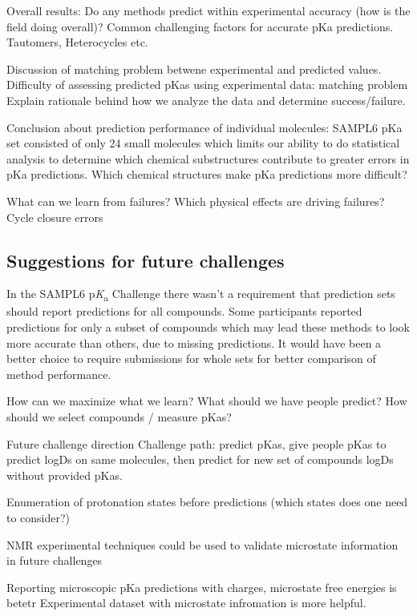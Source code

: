 \documentclass[9pt,lineno,final]{elife}
\newcommand{\pKa}{p\textit{K}\textsubscript{a}}
\begin{document}
Overall results:  
Do any methods predict within experimental accuracy (how is the field doing overall)?
Common challenging factors for accurate pKa predictions. Tautomers, Heterocycles etc.

Discussion of matching problem betwene experimental and predicted values.  
Difficulty of assessing predicted pKas using experimental data: matching problem
Explain rationale behind how we analyze the data and determine success/failure.

Conclusion about prediction performance of individual molecules:
SAMPL6 pKa set consisted of only 24 small molecules which limits our ability to do statistical analysis to determine which chemical substructures contribute to greater errors in pKa predictions.  
Which chemical structures make pKa predictions more difficult?  

What can we learn from failures? Which physical effects are driving failures?
Cycle closure errors


\subsection{Suggestions for future challenges}
In the SAMPL6 \pKa{} Challenge there wasn't a requirement that prediction sets should report predictions for all compounds. 
Some participants reported predictions for only a subset of compounds which may lead these methods to look more accurate than others, due to missing predictions.
It would have been a better choice to require submissions for whole sets for better comparison of method performance. 

How can we maximize what we learn?
What should we have people predict?
How should we select compounds / measure pKas?

Future challenge direction  
Challenge path: predict pKas, give people pKas to predict logDs on same molecules, then predict for new set of compounds logDs without provided pKas.  

Enumeration of protonation states before predictions (which states does one need to consider?)


NMR experimental techniques could be used to validate microstate information in future challenges

Reporting microscopic pKa predictions with charges, microstate free energies is betetr
Experimental dataset with microstate infromation is more helpful.
\end{document}
